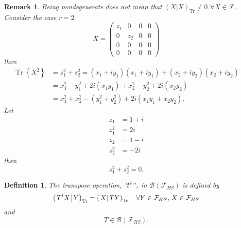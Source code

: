 \documentclass[aps, preprint]{revtex4}
\newtheorem{definition}[theorem]{Definition}
\newtheorem{remark}[theorem]{Remark}
\begin{document}
\begin{remark}
Being nondegenerate does not mean that $\left (\left .X\right \vert X\right )_{\ensuremath{\operatorname*{Tr}}} \neq 0$ $ \forall X \in \mathcal{F}\text{.}$ Consider the case $r =2$
\begin{equation}X =\left (\begin{array}{cccc}z_{1} & 0 & 0 & 0 \\
0 & z_{2} & 0 & 0 \\
0 & 0 & 0 & 0 \\
0 & 0 & 0 & 0\end{array}\right )
\end{equation}then
\begin{align}\ensuremath{\operatorname*{Tr}} \left \{X^{2}\right \} &  =z_{1}^{2} +z_{2}^{2} =\left (x_{1} +i y_{1}\right ) \left (x_{1} +i y_{1}\right ) +\left (x_{2} +i y_{2}\right ) \left (x_{2} +i y_{2}\right ) \\
 &  =x_{1}^{2} -y_{1}^{2} +2 i \left (x_{1} y_{1}\right ) +x_{2}^{2} -y_{2}^{2} +2 i \left (x_{2} y_{2}\right ) \\
 &  =x_{1}^{2} +x_{2}^{2} -\left (y_{1}^{2} +y_{2}^{2}\right ) +2 i \left (x_{1} y_{1} +x_{2} y_{2}\right )\text{.}\end{align}Let
\begin{align}z_{1} &  =1 +i \\
z_{1}^{2} &  =2 i \\
z_{2} &  =1 -i \\
z_{2}^{2} &  = -2 i\end{align}then
\begin{equation}z_{1}^{2} +z_{2}^{2} =0.
\end{equation}
\end{remark}


\begin{definition}
The transpose operation, "$t ""\text{,}$ in $\mathcal{B} \left (\mathcal{F}_{H S}\right )$ is defined by
\begin{equation}\left (\left .T^{t} X\right \vert Y\right )_{\ensuremath{\operatorname*{Tr}}} =\left (\left .X\right \vert T Y\right )_{\ensuremath{\operatorname*{Tr}}}\text{\quad } \forall Y \in \mathcal{F}_{H S} ,\,X \in \mathcal{F}_{H S}
\end{equation}and
\begin{equation}T \in \mathcal{B} \left (\mathcal{F}_{H S}\right )\text{.}
\end{equation}
\end{definition}
\end{document}

